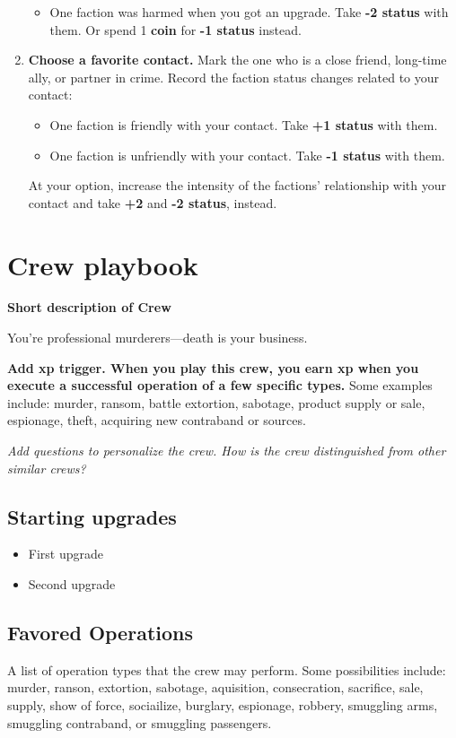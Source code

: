 \documentclass[11pt,fleqn,a5paper]{book}
\newcommand{\gameterm}[1]{\textbf{#1}}
\begin{document}
\begin{enumerate}
\begin{itemize}
		\item One faction was harmed when you got an upgrade. Take \textbf{-2 status} with them. Or spend 1 \gameterm{coin}  for \textbf{-1 status} instead.
		\end{itemize}
	\item \textbf{Choose a favorite contact.} Mark the one who is a close friend, long-time ally, or partner in crime. Record the faction status changes related to your contact:
		\begin{itemize}
		\item One faction is friendly with your contact. Take \textbf{+1 status} with them.
		\item One faction is unfriendly with your contact. Take \textbf{-1 status} with them.
		\end{itemize}
		At your option, increase the intensity of the factions’ relationship with your contact and take \textbf{+2} and \textbf{-2 status}, instead.
\end{enumerate}

\chapter{Crew playbook}

\textbf{Short description of Crew}

You’re professional murderers---death is your business.

\textbf{Add xp trigger. When you play this crew, you earn xp when you execute a successful operation of a few specific types.} Some examples include: murder, ransom, battle extortion, sabotage, product supply or sale, espionage, theft, acquiring new contraband or sources.

\emph{Add questions to personalize the crew. How is the crew distinguished from other similar crews?}

\section{Starting upgrades}
\begin{itemize}
	\item First upgrade
	\item Second upgrade
\end{itemize}

\section{Favored Operations}
A list of operation types that the crew may perform. Some possibilities include: murder, ranson, extortion, sabotage, aquisition, consecration, sacrifice, sale, supply, show of force, sociailize, burglary, espionage, robbery, smuggling arms, smuggling contraband, or smuggling passengers.
\end{document}
